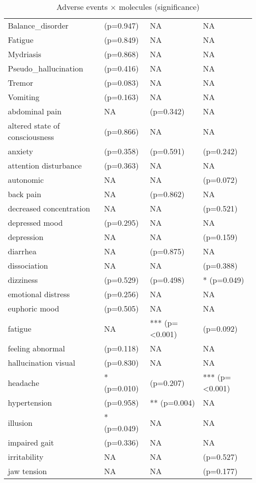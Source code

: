 \begin{table}[!h]
\centering
\caption{Adverse events × molecules (significance)}
\centering
\begin{tabular}[t]{llll}
\toprule
Balance\_disorder & (p=0.947) & NA & NA\\
Fatigue & (p=0.849) & NA & NA\\
Mydriasis & (p=0.868) & NA & NA\\
Pseudo\_hallucination & (p=0.416) & NA & NA\\
Tremor & (p=0.083) & NA & NA\\
\addlinespace
Vomiting & (p=0.163) & NA & NA\\
abdominal pain & NA & (p=0.342) & NA\\
altered state of consciousness & (p=0.866) & NA & NA\\
anxiety & (p=0.358) & (p=0.591) & (p=0.242)\\
attention disturbance & (p=0.363) & NA & NA\\
\addlinespace
autonomic & NA & NA & (p=0.072)\\
back pain & NA & (p=0.862) & NA\\
decreased concentration & NA & NA & (p=0.521)\\
depressed mood & (p=0.295) & NA & NA\\
depression & NA & NA & (p=0.159)\\
\addlinespace
diarrhea & NA & (p=0.875) & NA\\
dissociation & NA & NA & (p=0.388)\\
dizziness & (p=0.529) & (p=0.498) & * (p=0.049)\\
emotional distress & (p=0.256) & NA & NA\\
euphoric mood & (p=0.505) & NA & NA\\
\addlinespace
fatigue & NA & *** (p=<0.001) & (p=0.092)\\
feeling abnormal & (p=0.118) & NA & NA\\
hallucination visual & (p=0.830) & NA & NA\\
headache & * (p=0.010) & (p=0.207) & *** (p=<0.001)\\
hypertension & (p=0.958) & ** (p=0.004) & NA\\
\addlinespace
illusion & * (p=0.049) & NA & NA\\
impaired gait & (p=0.336) & NA & NA\\
irritability & NA & NA & (p=0.527)\\
jaw tension & NA & NA & (p=0.177)\\

\end{tabular}
\end{table}
